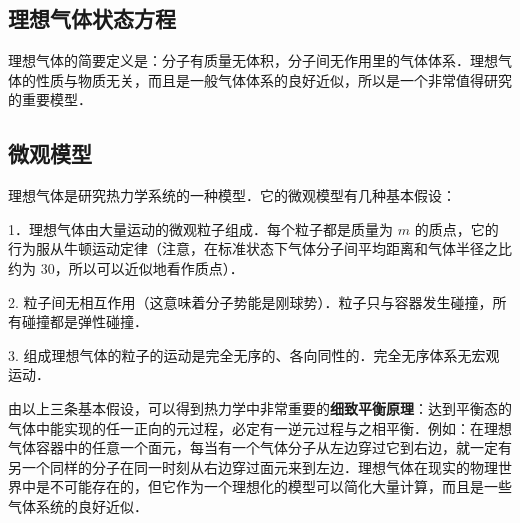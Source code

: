 
\begin{issues}
\issueDraft
\end{issues}

\subsection{理想气体状态方程}

理想气体的简要定义是：分子有质量无体积，分子间无作用里的气体体系．理想气体的性质与物质无关，而且是一般气体体系的良好近似，所以是一个非常值得研究的重要模型．

\subsection{微观模型}

理想气体是研究热力学系统的一种模型．它的微观模型有几种基本假设：

1．理想气体由大量运动的微观粒子组成．每个粒子都是质量为 $m$ 的质点，它的行为服从牛顿运动定律（注意，在标准状态下气体分子间平均距离和气体半径之比约为 $30$，所以可以近似地看作质点）．

2. 粒子间无相互作用（这意味着分子势能是刚球势）．粒子只与容器发生碰撞，所有碰撞都是弹性碰撞．

3. 组成理想气体的粒子的运动是完全无序的、各向同性的．完全无序体系无宏观运动．

由以上三条基本假设，可以得到热力学中非常重要的\textbf{细致平衡原理}：达到平衡态的气体中能实现的任一正向的元过程，必定有一逆元过程与之相平衡．例如：在理想气体容器中的任意一个面元，每当有一个气体分子从左边穿过它到右边，就一定有另一个同样的分子在同一时刻从右边穿过面元来到左边．理想气体在现实的物理世界中是不可能存在的，但它作为一个理想化的模型可以简化大量计算，而且是一些气体系统的良好近似．